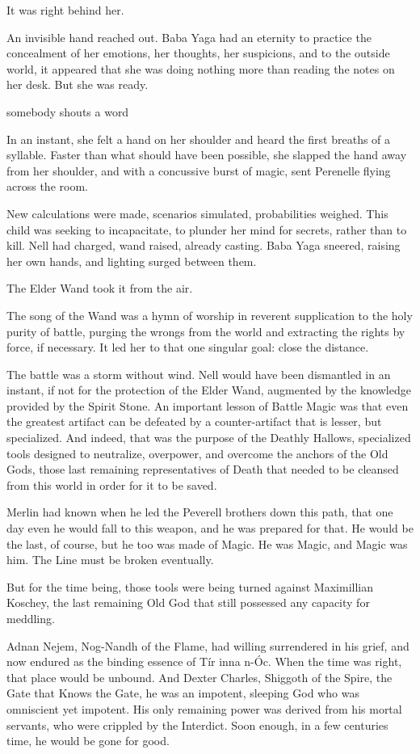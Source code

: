 It was right behind her.

An invisible hand reached out. Baba Yaga had an eternity to practice the concealment of her emotions, her thoughts, her suspicions, and to the outside world, it appeared that she was doing nothing more than reading the notes on her desk. But she was ready.

somebody shouts a word

In an instant, she felt a hand on her shoulder and heard the first breaths of a syllable. Faster than what should have been possible, she slapped the hand away from her shoulder, and with a concussive burst of magic, sent Perenelle flying across the room.

New calculations were made, scenarios simulated, probabilities weighed. This child was seeking to incapacitate, to plunder her mind for secrets, rather than to kill. Nell had charged, wand raised, already casting. Baba Yaga sneered, raising her own hands, and lighting surged between them.

The Elder Wand took it from the air.

The song of the Wand was a hymn of worship in reverent supplication to the holy purity of battle, purging the wrongs from the world and extracting the rights by force, if necessary. It led her to that one singular goal: close the distance.

The battle was a storm without wind. Nell would have been dismantled in an instant, if not for the protection of the Elder Wand, augmented by the knowledge provided by the Spirit Stone. An important lesson of Battle Magic was that even the greatest artifact can be defeated by a counter-artifact that is lesser, but specialized. And indeed, that was the purpose of the Deathly Hallows, specialized tools designed to neutralize, overpower, and overcome the anchors of the Old Gods, those last remaining representatives of Death that needed to be cleansed from this world in order for it to be saved.

Merlin had known when he led the Peverell brothers down this path, that one day even he would fall to this weapon, and he was prepared for that. He would be the last, of course, but he too was made of Magic. He was Magic, and Magic was him. The Line must be broken eventually.

But for the time being, those tools were being turned against Maximillian Koschey, the last remaining Old God that still possessed any capacity for meddling.

Adnan Nejem, Nog-Nandh of the Flame, had willing surrendered in his grief, and now endured as the binding essence of Tír inna n-Óc. When the time was right, that place would be unbound. And Dexter Charles, Shiggoth of the Spire, the Gate that Knows the Gate, he was an impotent, sleeping God who was omniscient yet impotent. His only remaining power was derived from his mortal servants, who were crippled by the Interdict. Soon enough, in a few centuries time, he would be gone for good.

